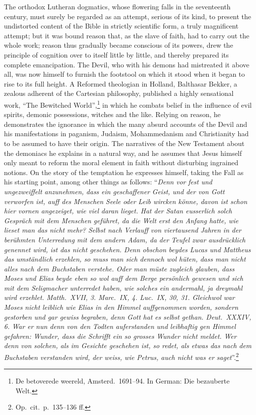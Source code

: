 \documentclass[12pt,a4paper]{article}
\newcommand{\opage}[1]{\marginnote{\footnotesize\textit{[#1]}}}
\begin{document}
The orthodox Lutheran dogmatics, whose flowering falls in the seventeenth
century, must surely be regarded as an attempt, serious of its kind, to
present the undistorted content of the Bible in strictly scientific form, a
truly magnificent attempt; but it was bound reason that, as the slave of
faith, had to carry out the whole work; reason thus gradually became
conscious of its powers, drew the principle of cognition over to itself
little by little, and thereby prepared its complete emancipation. The Devil,
who with his demons had mistreated it above all, was now himself to furnish
the footstool on which it stood when it began to rise to its full height. A
Reformed theologian in Holland, Balthasar Bekker, a zealous adherent of the
Cartesian philosophy, published a highly sensational work, ``The Bewitched
World'',\footnote{De betoverede weereld, Amsterd.\ 1691--94. In German: Die bezauberte Welt.} %
in which he combats belief in the influence of evil spirits, demonic
possessions, witches and the like. Relying on reason, he demonstrates the
ignorance in which the many absurd accounts of the Devil and his
manifestations in paganism, Judaism, Mohammedanism
\opage{25}and Christianity had to be assumed to have their origin. The narratives of
the New Testament about the demoniacs he explains in a natural way, and he
assumes that Jesus himself only meant to reform the moral element in faith
without disturbing ingrained notions. On the story of the temptation he
expresses himself, taking the Fall as his starting point, among other
things as follows: ``\textit{Denn vor fest und ungezweiffelt anzunehmen,
dass ein geschaffener Geist, und der von Gott verworfen ist, auff des
Menschen Seele oder Leib wircken könne, davon ist schon hier vornen
angezeiget, wie viel daran lieget. Hat der Satan eusserlich solch Gespräch
mit dem Menschen geführet, da die Welt erst den Anfang hatte, wie lieset man
das nicht mehr? Selbst nach Verlauff von viertausend Jahren in der
berühmten Unterredung mit dem andern Adam, da der Teufel zwar ausdrücklich
genennet wird, ist das nicht geschehen. Denn obschon beydes Lucas und
Mattheus das umständlich erzehlen, so muss man sich dennoch wol hüten, dass
man nicht alles nach dem Buchstaben verstehe. Oder man müste zugleich
glauben, dass Moses und Elias beyde eben so wol auff dem Berge persönlich
gewesen und sich mit dem Seligmacher unterredet haben, wie solches ein
andermahl, ja dreymahl wird erzehlet. Matth.\ XVII, 3. Marc.\ IX, 4. Luc.\
IX, 30, 31. Gleichwol war Moses nicht leiblich wie Elias in den Himmel
auffgenommen worden, sondern gestorben und gar gewiss begraben, denn Gott
hat es selbst gethan. Deut.\ XXXIV, 6. War er nun denn von den Todten
auferstanden und leibhaftig gen Himmel gefahren: Wunder, dass die Schrifft
ein so grosses Wunder nicht meldet. Wer denn von solchen, als im Gesichte
geschehen ist, so redet, als etwas das nach dem Buchstaben verstanden wird,
der weiss, wie Petrus, auch nicht was er saget}''.\footnote{Op.\ cit.\ p.\ 135--136 ff.} %
\end{document}
